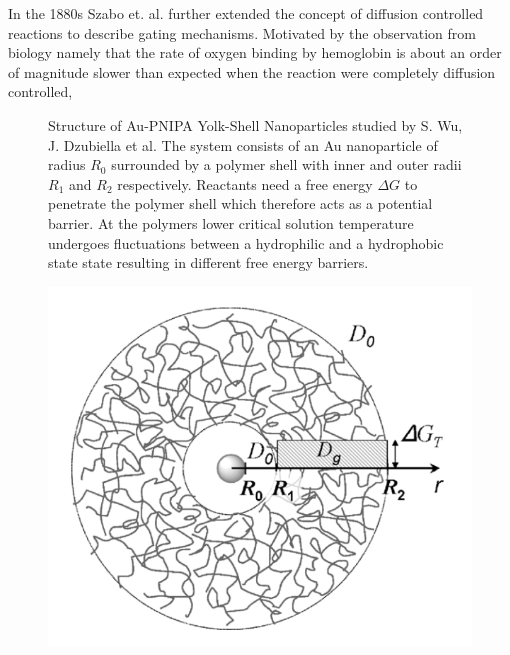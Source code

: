 In the 1880s Szabo et. al. \cite{Szabo1982} further extended the concept of diffusion controlled reactions to describe gating mechanisms. Motivated by the observation from biology namely that the rate of oxygen binding by hemoglobin is about an order of magnitude slower than expected when the reaction were completely diffusion controlled,\vspace{-1 cm}  \\

\begin{minipage}[t]{0.62 \textwidth}
    \begin{figure}[H]
        \caption{Structure of Au-PNIPA Yolk-Shell Nanoparticles studied by S. Wu, J. Dzubiella et al. The system consists of an Au nanoparticle of radius $R_0$ surrounded by a polymer shell with inner and outer radii $R_1$ and $R_2$ respectively. Reactants need a free energy $\Delta G$ to penetrate the polymer shell which therefore acts as a potential barrier. At the polymers lower critical solution temperature undergoes fluctuations between a hydrophilic and a hydrophobic state state resulting in different free energy barriers.}\label{PNIPA}
    \end{figure}
\end{minipage}\begin{minipage}[t]{0.38 \textwidth}
    \begin{figure}[H]
         \includegraphics[width = 1.1 \textwidth]{plots/PNIPA.png}
    \end{figure}
\end{minipage}
